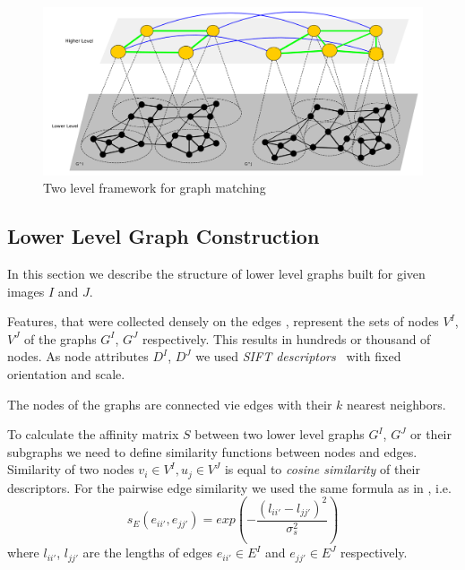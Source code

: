 \begin{figure}
	\centering
	\includegraphics[scale=0.35]{chapter2/fig/twolevels.pdf}
	\caption{Two level framework for graph matching} \label{fig:2levels}
\end{figure}

\FloatBarrier

\subsection{Lower Level Graph Construction}

In this section we describe the structure of lower level graphs built for given images $I$ and $J$.

Features, that were collected densely on the edges \cite{PMT}, represent the sets of nodes $V^I$, $V^J$ of the graphs $G^I$, $G^J$ respectively. This results in hundreds or thousand of nodes. As node attributes $D^I$, $D^J$ we used \emph{SIFT descriptors}~\cite{Lowe2004} with fixed orientation and scale. 

The nodes of the graphs are connected vie edges with their $k$ nearest neighbors.

To calculate the affinity matrix $S$ between two lower level graphs  $G^I$, $G^J$ or their subgraphs we need to define similarity functions between nodes and edges. Similarity of two nodes $v_i\in V^I, u_j\in V^J$ is equal to \emph{cosine similarity} of their descriptors.
For the pairwise edge similarity we used the same formula as in \cite{Cho2014_Haystack, Suh_CVPR2015}, i.e.\ 
\begin{equation}
s_E(e_{ii\prime}, e_{jj\prime}) = exp(-\frac{(l_{ii\prime} - l_{jj\prime})^2}{\sigma^2_{s}})
\label{eq:s_e}
\end{equation}
where $l_{ii\prime}$, $l_{jj\prime} $ are the lengths of edges $e_{ii\prime}\in E^I$ and $e_{jj\prime}\in E^J$ respectively.





